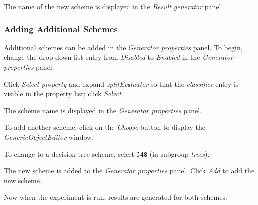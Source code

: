 \documentclass[a4paper]{article}
\begin{document}
The name of the new scheme is displayed in the \textit{Result generator} panel.
\begin{center}
\end{center}


\subsubsection*{Adding Additional Schemes}

Additional schemes can be added in the \textit{Generator properties} panel. To begin, change the drop-down list entry from \textit{Disabled} to \textit{Enabled} in the \textit{Generator properties} panel.
\begin{center}
\end{center}

Click \textit{Select property} and expand \textit{splitEvaluator} so that the \textit{classifier} entry is visible in the property list; click \textit{Select}.
\begin{center}
\end{center}

The scheme name is displayed in the \textit{Generator properties} panel.
\begin{center}
\end{center}

To add another scheme, click on the \textit{Choose} button to display the \textit{GenericObjectEditor} window.
\begin{center}
\end{center}

To change to a decision-tree scheme, select \texttt{J48} (in subgroup \textit{trees}).
\begin{center}
\end{center}

The new scheme is added to the \textit{Generator properties} panel. Click \textit{Add} to add the new scheme.
\begin{center}
\end{center}

Now when the experiment is run, results are generated for both schemes.
\end{document}
